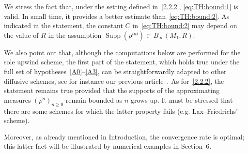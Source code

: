 \documentclass[11pt]{article}
\theoremstyle{definition}
\numberwithin{equation}{section}
\DeclareMathOperator{\Supp}{Supp}
\begin{document}
We stress the fact that, under the setting defined in~\eqref{2.2.2}, \eqref{eq:TH:bound:1} is valid. In small time, it provides a better estimate than~\eqref{eq:TH:bound:2}. As indicated in the statement, the constant $C$ in~\eqref{eq:TH:bound:2} may depend on the value of $R$ in the assumption $\Supp(\rho^{ini}) \subset B_{\infty}(M_{1},R)$.

We also point out that, although the computations below are performed for the sole upwind scheme, the first part of the statement, which holds true under the full set of hypotheses~\eqref{A0}--\eqref{A3}, can be straightforwardly adapted to other diffusive schemes, see for instance our previous article~\cite{DLV}. As for~\eqref{2.2.2}, the statement remains true provided that the supports of the approximating measures $(\rho^n)_{n \geq 0}$ remain bounded as $n$ grows up. It must be stressed that there are some schemes for which the latter property fails (e.g. Lax--Friedrichs' scheme).

Moreover, as already mentioned in Introduction, the convergence rate is optimal; this latter fact will be illustrated by numerical examples in Section~6.
\end{document}
